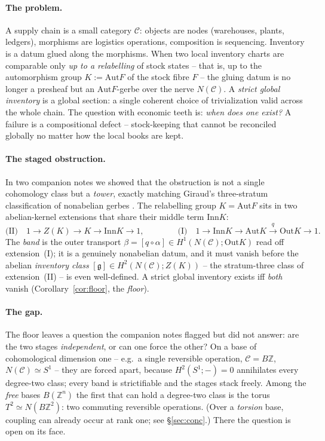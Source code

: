 \documentclass[11pt]{article}
\theoremstyle{definition}
\newcommand{\C}{\mathcal{C}}
\newcommand{\Z}{\mathbb{Z}}
\newcommand{\Aut}{\mathrm{Aut}}
\newcommand{\Inn}{\mathrm{Inn}}
\newcommand{\Out}{\mathrm{Out}}
\newcommand{\gerbe}{\mathfrak{g}}
\begin{document}
\paragraph{The problem.} A supply chain is a small category $\C$: objects are nodes
(warehouses, plants, ledgers), morphisms are logistics operations, composition is
sequencing. Inventory is a datum glued along the morphisms. When two local inventory
charts are comparable only \emph{up to a relabelling} of stock states -- that is, up to
the automorphism group $K:=\Aut F$ of the stock fibre $F$ -- the gluing datum is no longer
a presheaf but an $\Aut F$-gerbe over the nerve $N(\C)$. A \emph{strict global inventory}
is a global section: a single coherent choice of trivialization valid across the whole
chain. The question with economic teeth is: \emph{when does one exist?} A failure is a
compositional defect -- stock-keeping that cannot be reconciled globally no matter how the
local books are kept.

\paragraph{The staged obstruction.} In two companion notes we showed that the obstruction
is not a single cohomology class but a \emph{tower}, exactly matching Giraud's three-stratum
classification of nonabelian gerbes \cite{giraud,breen}. The relabelling group $K=\Aut F$
sits in two abelian-kernel extensions that share their middle term $\Inn K$:
\begin{equation}\label{eq:two-ext}
\text{(II)}\quad 1\to Z(K)\to K\to \Inn K\to 1,
\qquad\qquad
\text{(I)}\quad 1\to \Inn K\to \Aut K\xrightarrow{\ q\ }\Out K\to 1.
\end{equation}
The \emph{band} is the outer transport $\beta=[q\circ\alpha]\in H^1(N(\C);\Out K)$ read off
extension~(I); it is a genuinely nonabelian datum, and it must vanish before the abelian
\emph{inventory class} $[\gerbe]\in H^2(N(\C);Z(K))$ -- the stratum-three class of
extension~(II) -- is even well-defined. A strict global inventory exists iff \emph{both}
vanish (Corollary~\ref{cor:floor}, the \emph{floor}).

\paragraph{The gap.} The floor leaves a question the companion notes flagged but did not
answer: are the two stages \emph{independent}, or can one force the other? On a base of
cohomological dimension one -- e.g.\ a single reversible operation, $\C=B\Z$, $N(\C)\simeq
S^1$ -- they are forced apart, because $H^2(S^1;-)=0$ annihilates every degree-two class;
every band is strictifiable and the stages stack freely. Among the \emph{free} bases
$B(\Z^n)$ the first that can hold a degree-two class is the torus $T^2\simeq N(B\Z^2)$: two
commuting reversible operations. (Over a \emph{torsion} base, coupling can already occur at
rank one; see \S\ref{sec:conc}.) There the question is open on its face.
\end{document}
